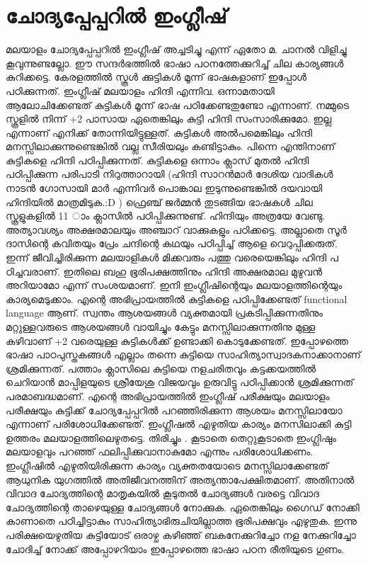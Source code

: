 \documentclass[10pt,a4paper]{report}
\begin{document}
    \section{ ചോദ്യപ്പേപ്പറിൽ ഇംഗ്ലീഷ്}
    മലയാളം ചോദ്യപ്പേപ്പറിൽ ഇംഗ്ലീഷ് അച്ചടിച്ചു എന്ന് ഏതോ മ. ചാനൽ വിളിച്ചു കൂവുന്നുണ്ടല്ലോ. ഈ സന്ദർഭത്തിൽ ഭാഷാ പഠനത്തേക്കുറിച്ച് ചില കാര്യങ്ങൾ കുറിക്കട്ടെ. കേരളത്തിൽ സ്കൂൾ ക്കുട്ടികൾ മൂന്ന് ഭാഷകളാണ് ഇപ്പോൾ പഠിക്കുന്നത്. ഇംഗ്ലീഷ് മലയാളം ഹിന്ദി എന്നിവ. ഒന്നാമതായി ആലോചിക്കേണ്ടത് കുട്ടികൾ മൂന്ന് ഭാഷ പഠിക്കേണ്ടതുണ്ടോ എന്നാണ്. നമ്മുടെ സ്കൂളിൽ നിന്ന് +2 പാസായ ഏതെങ്കിലും കുട്ടി ഹിന്ദി സംസാരിക്കുമോ. ഇല്ല എന്നാണ് എനിക്ക് തോന്നിയിട്ടുള്ളത്. കുട്ടികൾ അൽപമെങ്കിലും ഹിന്ദി മനസ്സിലാക്കുന്നുണ്ടെങ്കിൽ വല്ല സീരിയലും കണ്ടിട്ടാകും. പിന്നെ എന്തിനാണ് കുട്ടികളെ ഹിന്ദി പഠിപ്പിക്കുന്നത്. കുട്ടികളെ ഒന്നാം ക്ലാസ് മുതൽ ഹിന്ദി പഠിപ്പിക്കുന്ന പരിപാടി നിറുത്താറായി (ഹിന്ദി സാറൻമാർ ദേശിയ വാദികൾ നാടൻ ഗോസായി മാർ എന്നിവർ പൊങ്കാല ഇടുന്നുണ്ടെങ്കിൽ ദയവായി ഹിന്ദിയിൽ മാത്രമിടുക.:D ) ഫ്രെഞ്ച് ജർമ്മൻ തുടങ്ങിയ ഭാഷകൾ ചില സ്കൂളുകളിൽ 11 ാം ക്ലാസിൽ പഠിപ്പിക്കുന്നുണ്ട്. ഹിന്ദിയും അത്രയേ വേണ്ടു. അത്യാവശ്യം അക്ഷരമാലയും അഞ്ചാറ് വാക്കുകളും പഠിക്കട്ടെ. അല്ലാതെ സൂർ ദാസിന്റെ കവിതയും പ്രേം ചന്ദിന്റെ കഥയും പഠിപ്പിച്ച് ആളെ വെറുപ്പിക്കരുത്. ഇന്ന് ജീവിച്ചിരിക്കുന്ന മലയാളികൾ മിക്കവരും പത്തു വരെയെങ്കിലും ഹിന്ദി പ ഠിച്ചവരാണ്. ഇതിലെ ബഹു ഭൂരിപക്ഷത്തിനും ഹിന്ദി അക്ഷരമാല മുഴുവൻ അറിയാമോ എന്ന് സംശയമാണ്. ഇനി ഇംഗ്ലീഷിന്റെയും മലയാളത്തിന്റെയും കാര്യമെടുക്കാം. എന്റെ അഭിപ്രായത്തിൽ കുട്ടികളെ പഠിപ്പിക്കേണ്ടത് functional language ആണ്. സ്വന്തം ആശയങ്ങൾ വ്യക്തമായി പ്രകടിപ്പിക്കുന്നതിനും മറ്റുള്ളവരുടെ ആശയങ്ങൾ വായിച്ചും കേട്ടും മനസ്സിലാക്കുന്നതിനു മുള്ള കഴിവാണ് +2 വരെയുള്ള കുട്ടികൾക്ക് ഉണ്ടാക്കി കൊടുക്കേണ്ടത്. ഇപ്പോഴത്തെ ഭാഷാ പാഠപുസ്തകങ്ങൾ എല്ലാം തന്നെ കുട്ടിയെ സാഹിത്യാസ്വാദകനാക്കാനാണ് ശ്രമിക്കുന്നത്. പത്താം ക്ലാസിലെ കുട്ടിയെ നളചരിതവും കട്ടക്കയത്തിൽ ചെറിയാൻ മാപ്പിളയുടെ ശ്രീയേശു വിജയവും ഉരുവിട്ടു പഠിപ്പിക്കാൻ ശ്രമിക്കുന്നത് പരമാബദ്ധമാണ്. എന്റെ അഭിപ്രായത്തിൽ ഇംഗ്ലീഷ് പരീക്ഷയും മലയാളം പരീക്ഷയും കുട്ടിക്ക് ചോദ്യപ്പേപ്പറിൽ പറഞ്ഞിരിക്കുന്ന ആശയം മനസ്സിലായോ എന്നാണ് പരിശോധിക്കേണ്ടത്. ഇംഗ്ലീഷൽ എഴുതിയ കാര്യം മനസിലാക്കി കുട്ടി ഉത്തരം മലയാളത്തിലെഴുതട്ടെ. തിരിച്ചും . കൂടാതെ തെറ്റുകൂടാതെ ഇംഗ്ലിഷും മലയാളവും പറഞ്ഞ് ഫലിപ്പിക്കുവാനാകുമോ എന്നും പരിശോധിക്കണം. ഇംഗ്ലീഷിൽ എഴുതിയിരിക്കുന്ന കാര്യം വ്യക്തതയോടെ മനസ്സിലാക്കേണ്ടത് ആധുനിക യുഗത്തിൽ അതിജീവനത്തിന് അത്യന്താപേക്ഷിതമാണ്. അതിനാൽ വിവാദ ചോദ്യത്തിന്റെ മാതൃകയിൽ കൂടുതൽ ചോദ്യങ്ങൾ വരട്ടെ വിവാദ ചോദ്യത്തിന്റെ താഴെയുള്ള ചോദ്യങ്ങൾ നോക്കുക. ഏതെങ്കിലും ഗൈഡ് നോക്കി കാണാതെ പഠിച്ചിട്ടാകും സാഹിത്യാഭിരുചിയില്ലാത്ത ഭൂരിപക്ഷവും എഴുതുക. ഇന്നു പരിക്ഷയെഴുതിയ കുട്ടിയോട് ഒരാഴ്ച കഴിഞ്ഞ് ബകനേക്കുറിച്ചോ നള നേക്കുറിച്ചോ ചോദിച്ച് നോക്ക് അപ്പോഴറിയാം ഇപ്പോഴത്തെ ഭാഷാ പഠന രീതിയുടെ ഗുണം.
\end{document}
